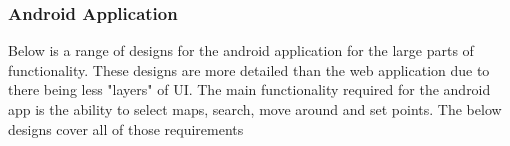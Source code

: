 \subsubsection{Android Application}
Below is a range of designs for the android application for the large parts of functionality. These designs are more detailed than the web application due to there being less "layers" of UI. The main functionality required for the android app is the ability to select maps, search, move around and set points. The below designs cover all of those requirements 
